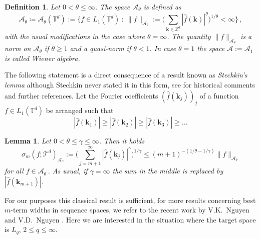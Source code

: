 \documentclass[11pt,reqno]{article}
\numberwithin{equation}{section}
\theoremstyle{definition}
\theoremstyle{plain}
\newtheorem{defi}[satz]{Definition}
\newtheorem{lem}[satz]{Lemma}
\newcommand{\zz}{\ensuremath{\mathbb{Z}}}
\newcommand{\tor}{\ensuremath{\mathbb{T}}}
\newcommand{\bk}{\ensuremath{\mathbf k}}
\begin{document}
\begin{defi}\label{defi_uww} Let $0<\theta \leq\infty$. The space $\mathcal{A}_\theta$ is defined as
$$
    \mathcal{A}_{\theta} \coloneqq\mathcal{A}_{\theta}(\tor^d):=\Big\{f \in L_1(\tor^d)~:~\|f\|_{\mathcal{A}_\theta}:=\Big(
    \sum\limits_{\mathbf{k}\in \zz^d} |\hat{f}(\mathbf{k})|^{\theta}\Big)^{1/\theta} < \infty\Big\}\,,
$$
with the usual modifications in the case where \(\theta = \infty\). The quantity $\|f\|_{\mathcal{A}_\theta}$ is a norm on $\mathcal{A}_{\theta}$ if $\theta\geq 1$ and a quasi-norm if $\theta<1$. In case $\theta=1$ the space $\mathcal{A}:=\mathcal{A}_{1}$ is called Wiener algebra. 
\end{defi}



The following statement is a direct consequence of a result known as {\em Stechkin's lemma} although Stechkin never stated it in this form, see \cite[Section 7.4]{DuTeUl18} for historical comments and further references.
Let the Fourier coefficients $(\hat{f}(\bk_j))_j$ of a function $f \in L_1(\tor^d) $ be arranged such that $$
|\hat{f}(\mathbf{k}_1)| \geq |\hat{f}(\mathbf{k}_2)| \geq |\hat{f}(\mathbf{k}_3)| \geq \dots$$


\begin{lem} \label{stechkin} Let  \(0 < \theta  \leq \gamma  \leq \infty \). Then it holds 
\begin{equation}
     \sigma_m(f;\mathcal{T}^d)_{\mathcal{A}_\gamma} := \Big(\sum\limits_{j=m+1}^{\infty} |\hat{f}(\mathbf{k}_j)|^{\gamma}\Big)^{1/\gamma} \leq (m+1)^{-(1/\theta - 1/\gamma)}\|f\|_{\mathcal{A}_{\theta}}   
\end{equation}
for all $f\in \mathcal{A}_{\theta}$\,. As usual, if $\gamma = \infty$ the sum in the middle is replaced by $|\hat{f}(\mathbf{k}_{m+1})|$.

\end{lem}
For our purposes this classical result is sufficient, for more results concerning best \(m\)-term widths in sequence spaces, we refer to the recent work by V.K.~Nguyen and V.D.~Nguyen \cite{NN22}. Here we are interested in the situation where the target space is $L_q$, $2\leq q \leq \infty$.

\end{document}
